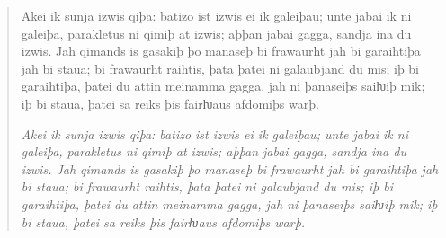 \begin{quote}
\large

Akei ik sunja izwis qiþa: batizo ist izwis ei ik galeiþau; unte jabai ik ni
galeiþa, parakletus ni qimiþ at izwis; aþþan jabai gagga, sandja ina du
izwis. Jah qimands is gasakiþ þo manaseþ bi frawaurht jah bi garaihtiþa
jah bi staua; bi frawaurht raihtis, þata þatei ni galaubjand du mis; iþ bi
garaihtiþa, þatei du attin meinamma gagga, jah ni þanaseiþs saiƕiþ mik;
iþ bi staua, þatei sa reiks þis fairƕaus afdomiþs warþ.

\smallskip

\itshape
Akei ik sunja izwis qiþa: batizo ist izwis ei ik galeiþau; unte jabai ik ni
galeiþa, parakletus ni qimiþ at izwis; aþþan jabai gagga, sandja ina du
izwis. Jah qimands is gasakiþ þo manaseþ bi frawaurht jah bi garaihtiþa
jah bi staua; bi frawaurht raihtis, þata þatei ni galaubjand du mis; iþ bi
garaihtiþa, þatei du attin meinamma gagga, jah ni þanaseiþs saiƕiþ mik;
iþ bi staua, þatei sa reiks þis fairƕaus afdomiþs warþ.

\end{quote}












